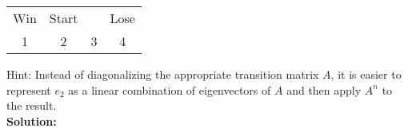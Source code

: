 \documentclass{article}
\begin{document}
\begin{center}
\begin{tabular}{|c|c|c|c|}
\hline
Win & Start & & Lose \\
1 & 2 & 3 & 4 \\
\hline
\end{tabular}
\end{center}

Hint: Instead of diagonalizing the appropriate transition matrix $A$, it is easier to represent $e_2$ as a linear combination of eigenvectors of $A$ and then apply $A^n$ to the result. \\

\textbf{Solution:} \\
\end{document}
